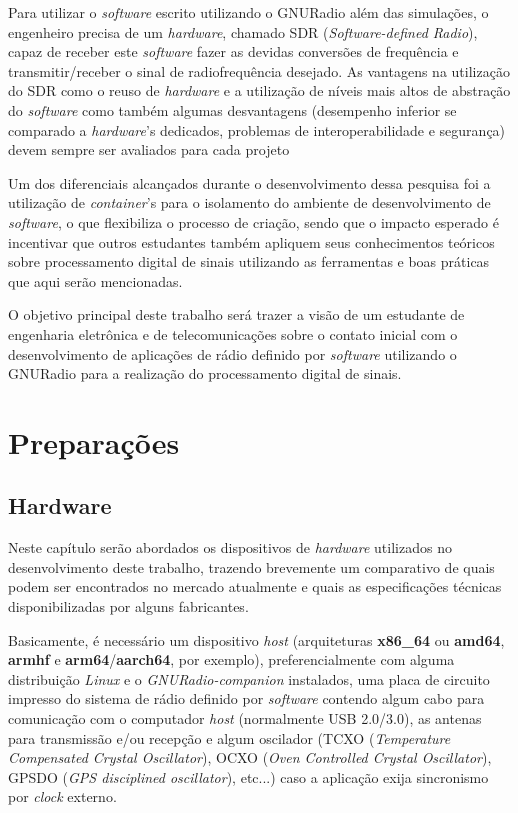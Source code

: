 \documentclass[
  12pt,				%
  openright,			%
  twoside,			%
  a4paper,			%
  english,			%
  french,				%
  spanish,			%
  brazil,				%
  ]{abntex2}
\begin{document}
Para utilizar o \textit{software} escrito utilizando o GNURadio além das simulações, o engenheiro precisa de um \textit{hardware}, chamado SDR (\textit{Software-defined Radio}), capaz de receber este \textit{software} fazer as devidas
conversões de frequência e transmitir/receber o sinal de radiofrequência desejado. As vantagens na utilização do SDR como o reuso de \textit{hardware} e a utilização de níveis mais altos de abstração do \textit{software} como também algumas desvantagens (desempenho inferior
se comparado a \textit{hardware}'s dedicados,  problemas  de  interoperabilidade e segurança) devem sempre ser avaliados para cada projeto \cite{sbrc:minicurso_gnuradio}

Um dos diferenciais alcançados durante o desenvolvimento dessa pesquisa foi a utilização de \textit{container}'s para o isolamento do ambiente de desenvolvimento de \textit{software}, o que
flexibiliza o processo de criação, sendo que o impacto esperado é incentivar que outros estudantes também apliquem seus conhecimentos teóricos sobre processamento digital de sinais
utilizando as ferramentas e boas práticas que aqui serão mencionadas.

O objetivo principal deste trabalho será trazer a visão de um estudante de engenharia eletrônica e de telecomunicações sobre o contato inicial com o desenvolvimento de aplicações de rádio
definido por \textit{software} utilizando o GNURadio para a realização do processamento digital de sinais.

\part{Preparações}

\chapter{Hardware}

Neste capítulo serão abordados os dispositivos de \textit{hardware} utilizados no desenvolvimento deste trabalho, trazendo brevemente um comparativo de quais
podem ser encontrados no mercado atualmente e quais as especificações técnicas disponibilizadas por alguns fabricantes.

Basicamente, é necessário um dispositivo \textit{host} (arquiteturas \textbf{x86\_64} ou \textbf{amd64}, \textbf{armhf} e \textbf{arm64}/\textbf{aarch64}, por exemplo),
preferencialmente com alguma distribuição \textit{Linux} e o \textit{GNURadio-companion} instalados, uma placa de circuito impresso do sistema de rádio
definido por \textit{software} contendo algum cabo para comunicação com o computador \textit{host} (normalmente USB 2.0/3.0), as antenas para transmissão e/ou recepção
e algum oscilador (TCXO (\textit{Temperature Compensated Crystal Oscillator}), OCXO (\textit{Oven Controlled Crystal Oscillator}), GPSDO (\textit{GPS disciplined oscillator}), etc...)
caso a aplicação exija sincronismo por \textit{clock} externo.
\end{document}
